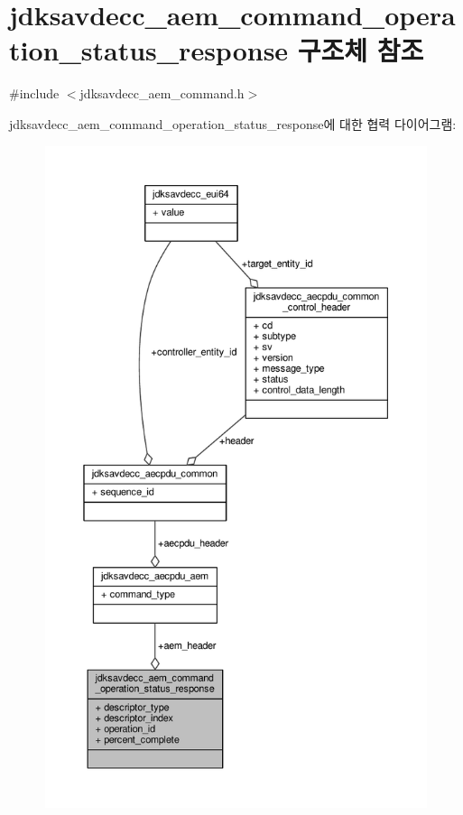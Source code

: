 \hypertarget{structjdksavdecc__aem__command__operation__status__response}{}\section{jdksavdecc\+\_\+aem\+\_\+command\+\_\+operation\+\_\+status\+\_\+response 구조체 참조}
\label{structjdksavdecc__aem__command__operation__status__response}


{\ttfamily \#include $<$jdksavdecc\+\_\+aem\+\_\+command.\+h$>$}



jdksavdecc\+\_\+aem\+\_\+command\+\_\+operation\+\_\+status\+\_\+response에 대한 협력 다이어그램\+:
\nopagebreak
\begin{figure}[H]
\begin{center}
\leavevmode
\includegraphics[height=550pt]{structjdksavdecc__aem__command__operation__status__response__coll__graph}
\end{center}
\end{figure}
